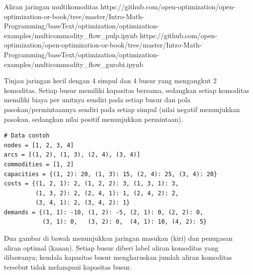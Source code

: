 \begin{examplewithallcode}{Aliran jaringan multikomoditas}
{}
{https://github.com/open-optimization/open-optimization-or-book/tree/master/Intro-Math-Programming/baseText/optimization/optimization-examples/multicommodity_flow_pulp.ipynb}
{https://github.com/open-optimization/open-optimization-or-book/tree/master/Intro-Math-Programming/baseText/optimization/optimization-examples/multicommodity_flow_gurobi.ipynb}
\label{ex:multicommodity-network-flow}

Tinjau jaringan kecil dengan 4 simpul dan 4 busur yang mengangkut 2 komoditas. Setiap busur memiliki kapasitas bersama, sedangkan setiap komoditas memiliki biaya per unitnya sendiri pada setiap busur dan pola pasokan/permintaannya sendiri pada setiap simpul (nilai negatif menunjukkan pasokan, sedangkan nilai positif menunjukkan permintaan).
\begin{verbatim}
# Data contoh
nodes = [1, 2, 3, 4]
arcs = [(1, 2), (1, 3), (2, 4), (3, 4)]
commodities = [1, 2]
capacities = {(1, 2): 20, (1, 3): 15, (2, 4): 25, (3, 4): 20}
costs = {(1, 2, 1): 2, (1, 2, 2): 3, (1, 3, 1): 3,
         (1, 3, 2): 2, (2, 4, 1): 1, (2, 4, 2): 2,
         (3, 4, 1): 2, (3, 4, 2): 1}
demands = {(1, 1): -10, (1, 2): -5, (2, 1): 0, (2, 2): 0,
           (3, 1): 0,   (3, 2): 0,  (4, 1): 10, (4, 2): 5}
\end{verbatim}

Dua gambar di bawah menunjukkan jaringan masukan (kiri) dan penugasan aliran optimal (kanan). Setiap busur diberi label aliran komoditas yang dibawanya; kendala kapasitas busur mengharuskan jumlah aliran komoditas tersebut tidak melampaui kapasitas busur.

\begin{center}
\end{center}
\end{examplewithallcode}
